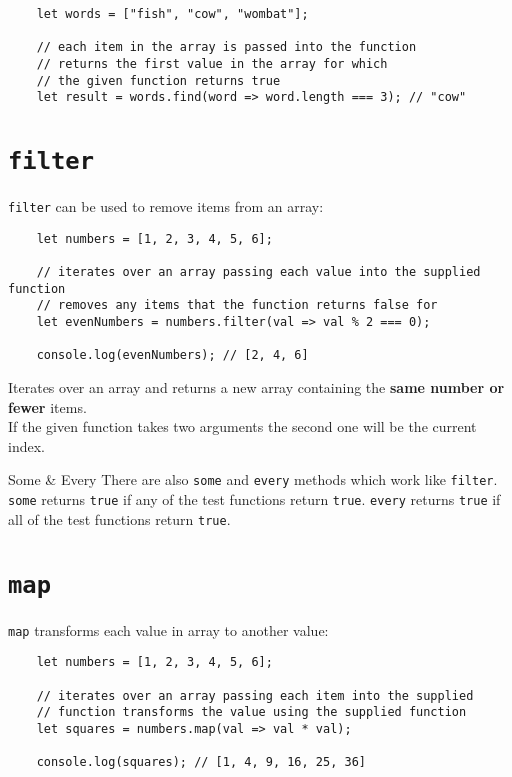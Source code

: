 \begin{verbatim}
    let words = ["fish", "cow", "wombat"];

    // each item in the array is passed into the function
    // returns the first value in the array for which
    // the given function returns true
    let result = words.find(word => word.length === 3); // "cow"
\end{verbatim}



\section{\texttt{filter}}

\texttt{filter} can be used to remove items from an array:

\begin{verbatim}
    let numbers = [1, 2, 3, 4, 5, 6];

    // iterates over an array passing each value into the supplied function
    // removes any items that the function returns false for
    let evenNumbers = numbers.filter(val => val % 2 === 0);

    console.log(evenNumbers); // [2, 4, 6]
\end{verbatim}

Iterates over an array and returns a new array containing the \textbf{same number or fewer} items.
\\

If the given function takes two arguments the second one will be the current index.
\\

\begin{infobox}{Some \& Every}
    There are also \texttt{some} and \texttt{every} methods which work like \texttt{filter}. \texttt{some} returns \texttt{true} if any of the test functions return \texttt{true}. \texttt{every} returns \texttt{true} if all of the test functions return \texttt{true}.
\end{infobox}



\section{\texttt{map}}

\texttt{map} transforms each value in array to another value:

\begin{verbatim}
    let numbers = [1, 2, 3, 4, 5, 6];

    // iterates over an array passing each item into the supplied
    // function transforms the value using the supplied function
    let squares = numbers.map(val => val * val);

    console.log(squares); // [1, 4, 9, 16, 25, 36]
\end{verbatim}

